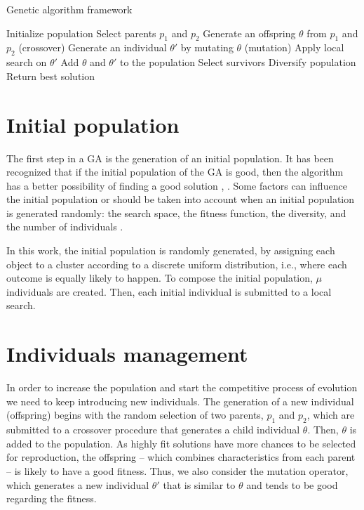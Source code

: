 \begin{algorithm}[H]
\caption{Genetic algorithm framework}
\label{genetic-algo}
\begin{algorithmic}[1]
\STATE Initialize population
\STATE Select parents $p_1$ and $p_2$
\STATE Generate an offspring $\theta$ from $p_1$ and $p_2$ (crossover)
\STATE Generate an individual $\theta'$ by mutating $\theta$ (mutation)
\STATE Apply local search on $\theta'$
\STATE Add $\theta$ and $\theta'$ to the population
\STATE Select survivors
\STATE Diversify population
\ENDIF
\ENDIF
\ENDWHILE
\STATE Return best solution
\end{algorithmic}
\end{algorithm}

\section{Initial population}
The first step in a GA is the generation of an initial population. It has been recognized that if the initial population of the GA is good, then the algorithm has a better possibility of finding a good solution \cite{Burke2004}, \cite{Zitzler2000}. Some factors can influence the initial population or should be taken into account when an initial population is generated randomly: the search space, the fitness function, the diversity, and the number of individuals \cite{DiazGomez2007}.

In this work, the initial population is randomly generated, by assigning each object to a cluster according to a discrete uniform distribution, i.e., where each outcome is equally likely to happen. To compose the initial population, $\mu$ individuals are created. Then, each initial individual is submitted to a local search.

\section{Individuals management}
In order to increase the population and start the competitive process of evolution we need to keep introducing new individuals. The generation of a new individual (offspring) begins with the random selection of two parents, $p_1$ and $p_2$, which are submitted to a crossover procedure that generates a child individual $\theta$. Then, $\theta$ is added to the population. As highly fit solutions have more chances to be selected for reproduction, the offspring -- which combines characteristics from each parent -- is likely to have a good fitness. Thus, we also consider the mutation operator, which generates a new individual $\theta'$ that is similar to $\theta$ and tends to be good regarding the fitness.

